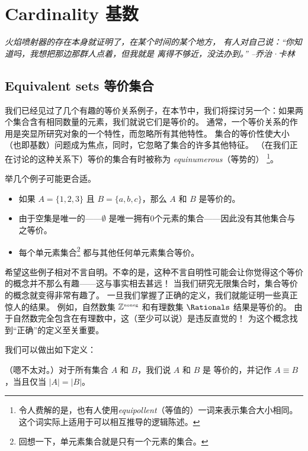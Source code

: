 \chapter{Cardinality 基数}
\label{ch:card}

{\em 火焰喷射器的存在本身就证明了，在某个时间的某个地方，
    有人对自己说：“你知道吗，我想把那边那群人点着，但我就是
    离得不够近，没法办到。” --乔治·卡林}

\section{Equivalent sets 等价集合}
\label{sec:equiv_sets}

我们已经见过了几个有趣的等价关系例子，在本节中，我们将探讨另一个：如果两个集合含有相同数量的元素，我们就说它们是等价的。
通常，一个等价关系的作用是突显所研究对象的一个特性，而忽略所有其他特性。
集合的等价性使大小（也即基数）问题成为焦点，同时，它忽略了集合的许多其他特征。
（在我们正在讨论的这种关系下）等价的集合有时被称为
\emph{equinumerous}（等势的）
\footnote{令人费解的是，也有人使用\emph{equipollent}（等值的）一词来表示集合大小相同。
    这个词实际上适用于可以相互推导的逻辑陈述。}。

举几个例子可能更合适。

\begin{itemize}
    \item 如果 $A = \{1, 2, 3\}$ 且 $B = \{a, b, c\}$，那么 $A$ 和 $B$ 是等价的。

    \item 由于空集是唯一的——$\emptyset$ 是唯一拥有0个元素的集合——因此没有其他集合与之等价。

    \item 每个单元素集合\footnote{回想一下，单元素集合就是只有一个元素的集合。}
          都与其他任何单元素集合等价。

\end{itemize}

希望这些例子相对不言自明。不幸的是，这种不言自明性可能会让你觉得这个等价的概念并不那么有趣——这与事实相去甚远！
当我们研究无限集合时，集合等价的概念就变得非常有趣了。
一旦我们掌握了正确的定义，我们就能证明一些真正惊人的结果。
例如，自然数集 ${\mathbb Z}^{\mbox{\tiny noneg}}$ 和有理数集 $\Rationals$ 结果是等价的。
由于自然数完全包含在有理数中，这（至少可以说）是违反直觉的！
为这个概念找到“正确”的定义至关重要。

我们可以做出如下定义：
\begin{defi}
    （嗯\textellipsis 不太对。）对于所有集合 $A$ 和 $B$，我们说 $A$ 和 $B$ 是
    等价的，并记作 $A \equiv B$，当且仅当 $|A|
        = |B|$。
\end{defi}


